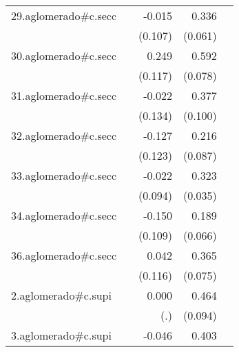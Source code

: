 {\begin{longtable}{l*{4}{D{.}{.}{-1}}}
\addlinespace
29.aglomerado#c.secc&                     &      -0.015         &       0.336\sym{***}&                     \\
            &                     &     (0.107)         &     (0.061)         &                     \\
\addlinespace
30.aglomerado#c.secc&                     &       0.249\sym{*}  &       0.592\sym{***}&                     \\
            &                     &     (0.117)         &     (0.078)         &                     \\
\addlinespace
31.aglomerado#c.secc&                     &      -0.022         &       0.377\sym{***}&                     \\
            &                     &     (0.134)         &     (0.100)         &                     \\
\addlinespace
32.aglomerado#c.secc&                     &      -0.127         &       0.216\sym{*}  &                     \\
            &                     &     (0.123)         &     (0.087)         &                     \\
\addlinespace
33.aglomerado#c.secc&                     &      -0.022         &       0.323\sym{***}&                     \\
            &                     &     (0.094)         &     (0.035)         &                     \\
\addlinespace
34.aglomerado#c.secc&                     &      -0.150         &       0.189\sym{**} &                     \\
            &                     &     (0.109)         &     (0.066)         &                     \\
\addlinespace
36.aglomerado#c.secc&                     &       0.042         &       0.365\sym{***}&                     \\
            &                     &     (0.116)         &     (0.075)         &                     \\
\addlinespace
2.aglomerado#c.supi&                     &       0.000         &       0.464\sym{***}&                     \\
            &                     &         (.)         &     (0.094)         &                     \\
\addlinespace
3.aglomerado#c.supi&                     &      -0.046         &       0.403\sym{***}&                     \\

\end{longtable}}
